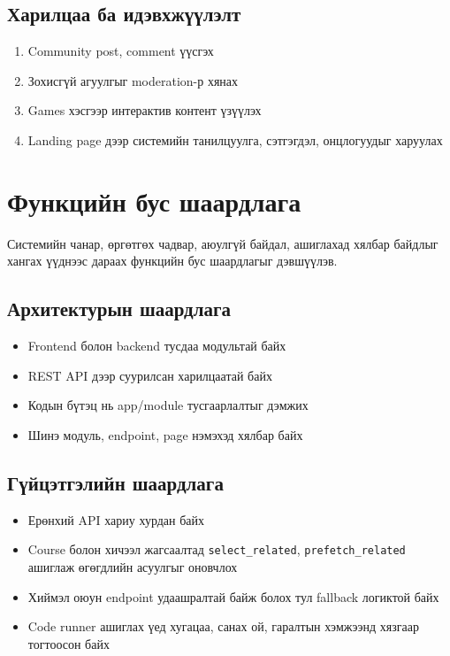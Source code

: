 \subsection{Харилцаа ба идэвхжүүлэлт}
\begin{enumerate}
\item Community post, comment үүсгэх
\item Зохисгүй агуулгыг moderation-р хянах
\item Games хэсгээр интерактив контент үзүүлэх
\item Landing page дээр системийн танилцуулга, сэтгэгдэл, онцлогуудыг харуулах
\end{enumerate}

\section{Функцийн бус шаардлага}
Системийн чанар, өргөтгөх чадвар, аюулгүй байдал, ашиглахад хялбар байдлыг хангах үүднээс дараах функцийн бус шаардлагыг дэвшүүлэв.

\subsection{Архитектурын шаардлага}
\begin{itemize}
\item Frontend болон backend тусдаа модультай байх
\item REST API дээр суурилсан харилцаатай байх
\item Кодын бүтэц нь app/module тусгаарлалтыг дэмжих
\item Шинэ модуль, endpoint, page нэмэхэд хялбар байх
\end{itemize}

\subsection{Гүйцэтгэлийн шаардлага}
\begin{itemize}
\item Ерөнхий API хариу хурдан байх
\item Course болон хичээл жагсаалтад \texttt{select\_related}, \texttt{prefetch\_related} ашиглаж өгөгдлийн асуулгыг оновчлох
\item Хиймэл оюун endpoint удаашралтай байж болох тул fallback логиктой байх
\item Code runner ашиглах үед хугацаа, санах ой, гаралтын хэмжээнд хязгаар тогтоосон байх
\end{itemize}

